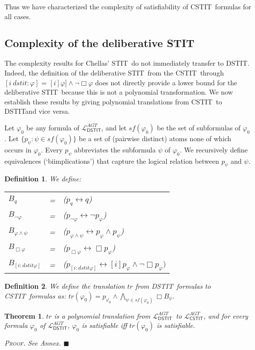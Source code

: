 \documentclass{article}
\newtheorem{definition}{Definition}
\newtheorem{theorem}{Theorem}
\newenvironment{pf}{\em \medskip\noindent \textsc{Proof.}}
{\hspace*{\fill}\nolinebreak[2]\hspace*{\fill}$\blacksquare$\medskip}
\renewcommand{\phi}{\varphi}
\newcommand{\eqv}{\leftrightarrow}      \newcommand{\imp}{\rightarrow}          \newcommand{\subfml}{\mathit{sf}}
\newcommand{\cstit}[1]{[{#1}]}           \newcommand{\poscstit}[1]{\langle {#1} \rangle}    \newcommand{\dstit}[2]{[{#1}\ \mathit{dstit}\! :{#2}]}
\newcommand{\agtset}{\ensuremath{\mathit{AGT}}}
\newcommand{\STIT} {{\textsf{STIT}}}              \newcommand{\CSTIT}{{\textsf{CSTIT}}}            \newcommand{\DSTIT}{{\textsf{DSTIT}}}
\newcommand{\LCSTIT}{$\mathcal{L}_{\mathsf{CSTIT}}^\agtset$}
\newcommand{\LDSTIT}{$\mathcal{L}_{\mathsf{DSTIT}}^\agtset$}
\begin{document}
Thus we have characterized the complexity of satisfiability of \CSTIT\
formulas for all cases.


\goodbreak
\subsection{Complexity of the deliberative \STIT}

The complexity results for Chellas' \STIT\ do not immediately transfer to \DSTIT.
Indeed, the definition of the deliberative \STIT\ from the \CSTIT\ through
$[i\ \mathit{dstit}\! :\phi]$ = $\cstit{i} \phi] \land \lnot \Box \phi$
does not directly provide a lower bound for the deliberative \STIT\
because this is not a polynomial transformation.
We now establish these results by giving polynomial translations
from \CSTIT\ to \DSTIT and vice versa.


Let $\phi_0$ be any formula of \LDSTIT, and
let $\subfml(\phi_0) $ be the set of subformulas of $\phi_0$.
Let $\{p_\psi : \psi \in \subfml(\phi_0)\}$ be a set of (pairwise distinct) atoms none of
which occurs in $\phi_0$.
Every $p_\psi$ abbreviates the subformula $\psi $ of $\phi_0$.
We recursively define equivalences (`biimplications') that capture
the logical relation between $p_\psi$ and $\psi$.

\begin{definition}
We define:
\begin{center}
\begin{tabular}{lll}
$B_q$ &         = &  ($p_q \eqv q $)\\
$B_{\lnot \phi}$ & = & ($p_{\lnot \phi} \eqv \lnot p_{\phi} $)\\
$B_{\phi \land \psi}$& =  & ($p_{\phi \land \psi} \eqv p_{\phi} \land p_{\psi} $)\\
$B_{\Box \phi }$ & = & ($p_{\Box \phi} \eqv \Box p_{\phi} $)\\
$B_{[i:dstit \phi]}$ & = & ($p_{[i:dstit \phi]} \eqv
                                        [i]p_\phi \land \lnot \Box p_{\phi} )$
\end{tabular}
\end{center}
\end{definition}

\begin{definition}
We define the translation $tr $ from \DSTIT\ formulas to \CSTIT\ formulas as:
$tr(\phi_0) = p_{\phi_0} \land \bigwedge_{\psi \in \subfml(\phi_0)} \Box B_\psi $.
\end{definition}


\begin{theorem}\label{theo:dstitNexptHard}
$tr$ is a polynomial translation from \LDSTIT\ to \LCSTIT, and
for every formula $\phi_0$ of \LDSTIT,
$\phi_0$ is satisfiable iff $tr(\phi_0) $ is satisfiable.

\begin{pf}
See Annex.
\end{pf}
\end{theorem}
\end{document}
